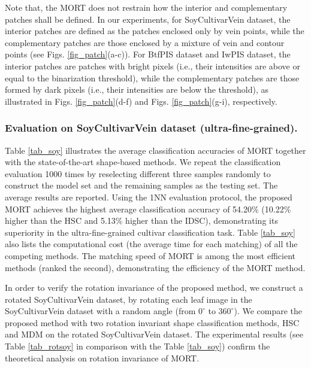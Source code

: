 \documentclass[letterpaper]{article} %
\begin{document}
Note that, the  MORT does not restrain how the interior and complementary patches shall be defined. In our experiments, for SoyCultivarVein dataset, the interior patches are defined as the patches enclosed only by vein points, while the complementary patches are those enclosed by a mixture of vein and contour points (see Figs. \ref{fig_patch}(a-c)). For BtfPIS dataset and IwPIS dataset, the interior patches are patches with bright pixels (i.e., their intensities are above or equal to the binarization threshold), while the complementary patches are those formed by dark pixels (i.e., their intensities are below the threshold), as illustrated in Figs. \ref{fig_patch}(d-f) and Figs. \ref{fig_patch}(g-i), respectively.
\subsubsection{Evaluation on SoyCultivarVein dataset (ultra-fine-grained).}
Table \ref{tab_soy} illustrates the average classification accuracies of MORT together with the state-of-the-art shape-based methods. We repeat the classification evaluation 1000 times by reselecting different three samples randomly to construct the model set and the remaining samples as the testing set. The average results are reported. Using the 1NN evaluation protocol, the proposed MORT achieves the highest average classification accuracy of 54.20\% (10.22\% higher than the HSC and 5.13\% higher than the IDSC), demonstrating its superiority in the ultra-fine-grained cultivar classification task. Table \ref{tab_soy} also lists the computational cost (the average time for each matching) of all the competing methods. The matching speed of MORT is among the most efficient methods (ranked the second), demonstrating the efficiency of the MORT method.


In order to verify the rotation invariance of the proposed method, we construct a rotated SoyCultivarVein dataset, by rotating each leaf image in the SoyCultivarVein dataset with a random angle (from $0^\circ$ to $360^\circ$). We compare the proposed method with two rotation invariant shape classification methods, HSC and MDM on the rotated SoyCultivarVein dataset. The experimental results (see Table \ref{tab_rotsoy} in comparison with the Table \ref{tab_soy}) confirm the theoretical analysis on rotation invariance of MORT.
\end{document}
